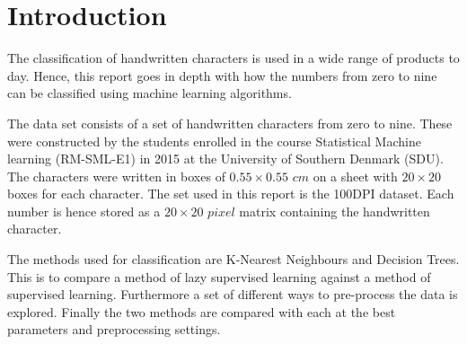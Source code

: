 \section{Introduction}

The classification of handwritten characters is used in a wide range of products to day.
Hence, this report goes in depth with how the numbers from zero to nine can be classified using machine learning algorithms.

The data set consists of a set of handwritten characters from zero to nine.
These were constructed by the students enrolled in the course Statistical Machine learning (RM-SML-E1) in 2015 at the University of Southern Denmark (SDU).
The characters were written in boxes of $0.55 \times 0.55 \textit{ cm}$ on a sheet with $20 \times 20$ boxes for each character.
The set used in this report is the 100DPI dataset.
Each number is hence stored as a $20 \times 20 \textit{ pixel}$ matrix containing the handwritten character.

The methods used for classification are K-Nearest Neighbours and Decision Trees.
This is to compare a method of lazy supervised learning against a method of supervised learning.
Furthermore a set of different ways to pre-process the data is explored.
Finally the two methods are compared with each at the best parameters and preprocessing settings.

